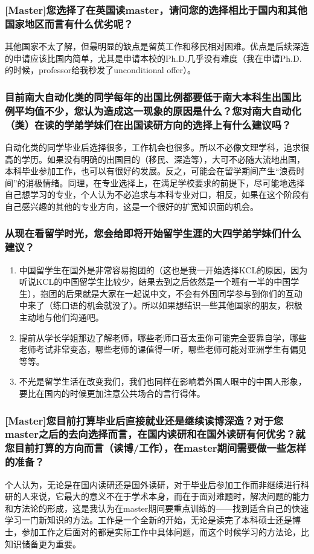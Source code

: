 \documentclass[a4paper,UTF8]{book}
\begin{document}
    \subsubsection*{[Master]您选择了在英国读master，请问您的选择相比于国内和其他国家地区而言有什么优劣呢？}
    其他国家不太了解，但最明显的缺点是留英工作和移民相对困难。优点是后续深造的申请应该比国内简单，尤其是申请本校的Ph.D.几乎没有难度（我在申请Ph.D.的时候，professor给我秒发了unconditional offer）。

    \subsubsection*{目前南大自动化类的同学每年的出国比例都要低于南大本科生出国比例平均值不少，您认为造成这一现象的原因是什么？您对南大自动化（类）在读的学弟学妹们在出国读研方向的选择上有什么建议吗？}
    自动化类的同学毕业后选择很多，工作机会也很多。所以不必像文理学科，追求很高的学历。如果没有明确的出国目的（移民、深造等），大可不必随大流地出国，本科毕业参加工作，也可以有很好的发展。反之，可能会在留学期间产生“浪费时间”的消极情绪。同理，在专业选择上，在满足学校要求的前提下，尽可能地选择自己想学习的专业，个人认为不必追求与本科专业对口，相反，如果在这个阶段有自己感兴趣的其他的专业方向，这是一个很好的扩宽知识面的机会。
    \subsubsection*{从现在看留学时光，您会给即将开始留学生涯的大四学弟学妹们什么建议？}
        \begin{enumerate}[itemindent=0pt,itemsep=0pt,parsep=0pt]
            \item 中国留学生在国外是非常容易抱团的（这也是我一开始选择KCL的原因，因为听说KCL的中国留学生比较少，结果去到之后依然是一个班有一半的中国学生），抱团的后果就是大家在一起说中文，不会有外国同学参与到你们的互动中来了（练口语的机会就没了）。所以如果想结识一些其他国家的朋友，积极主动地与他们沟通吧。
            \item 提前从学长学姐那边了解老师，哪些老师口音太重你可能完全要靠自学，哪些老师考试非常变态，哪些老师的课值得一听，哪些老师可能对亚洲学生有偏见等等。
            \item 不光是留学生活在改变我们，我们也同样在影响着外国人眼中的中国人形象，要比在国内的时候更加注意公共场合的言行得体。
        \end{enumerate}
        
    \subsubsection*{[Master]您目前打算毕业后直接就业还是继续读博深造？对于您master之后的去向选择而言，在国内读研和在国外读研有何优劣？就您目前打算的方向而言（读博/工作），在master期间需要做一些怎样的准备？}
    个人认为，无论是在国内读研还是国外读研，对于毕业后参加工作而非继续进行科研的人来说，它最大的意义不在于学术本身，而在于面对难题时，解决问题的能力和方法论的形成，这是我认为在master期间要重点训练的——找到适合自己的快速学习一门新知识的方法。工作是一个全新的开始，无论是读完了本科硕士还是博士，参加工作之后面对的都是实际工作中具体问题，而这个时候学习的方法论，比知识储备更为重要。   
\end{document}
